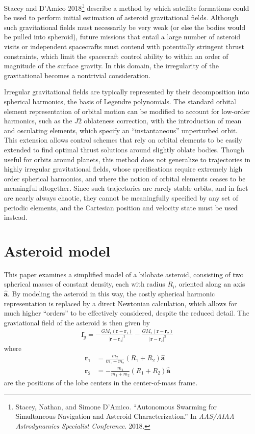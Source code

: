\documentclass{article}
\newcommand{\uvec}[1]{\boldsymbol{\hat{\textbf{#1}}}}
\begin{document}
\begin{multicols}{2}
Stacey and D'Amico 2018\footnote{Stacey, Nathan, and Simone D’Amico. ``Autonomous Swarming for Simultaneous Navigation and Asteroid Characterization.'' In \emph{AAS/AIAA Astrodynamics Specialist Conference}. 2018.} describe a method by which satellite formations could be used to perform initial estimation of asteroid gravitational fields. Although such gravitational fields must necessarily be very weak (or else the bodies would be pulled into spheroid), future missions that entail a large number of asteroid visits or independent spacecrafts must contend with potentially stringent thrust constraints, which limit the spacecraft control ability to within an order of magnitude of the surface gravity. In this domain, the irregularity of the gravitational becomes a nontrivial consideration.

Irregular gravitational fields are typically represented by their decomposition into spherical harmonics, the basis of Legendre polynomials. The standard orbital element representation of orbital motion can be modified to account for low-order harmonics, such as the $J2$ oblateness correction, with the introduction of mean and osculating elements, which specify an ``instantaneous'' unperturbed orbit. This extension allows control schemes that rely on orbital elements to be easily extended to find optimal thrust solutions around slightly oblate bodies. Though useful for orbits around planets, this method does not generalize to trajectories in highly irregular gravitational fields, whose specifications require extremely high order spherical harmonics, and where the notion of orbital elements ceases to be meaningful altogether. Since such trajectories are rarely stable orbits, and in fact are nearly always chaotic, they cannot be meaningfully specified by any set of periodic elements, and the Cartesian position and velocity state must be used instead.

\section*{Asteroid model}
This paper examines a simplified model of a bilobate asteroid, consisting of two spherical masses of constant density, each with radius $R_{i}$, oriented along an axis $\uvec{a}$. By modeling the asteroid in this way, the costly spherical harmonic representation is replaced by a direct Newtonian calculation, which allows for much higher ``orders'' to be effectively considered, despite the reduced detail. The graviational field of the asteroid is then given by
\begin{align*}
	\mathbf{f}_{g} = -\frac{GM_{1}(\mathbf{r} - \mathbf{r}_{1})}{|\mathbf{r} - \mathbf{r}_{1}|^{3}} - \frac{GM_{2}(\mathbf{r} - \mathbf{r}_{2})}{|\mathbf{r} - \mathbf{r}_{2}|^{3}}
\end{align*}
where
\begin{align*}
	\mathbf{r}_{1} &= \frac{m_{2}}{m_{1} + m_{2}}(R_{1} + R_{2})\uvec{a}\\
	\mathbf{r}_{2} &= -\frac{m_{1}}{m_{1} + m_{2}}(R_{1} + R_{2})\uvec{a}
\end{align*}
are the positions of the lobe centers in the center-of-mass frame.


\end{multicols}
\end{document}
